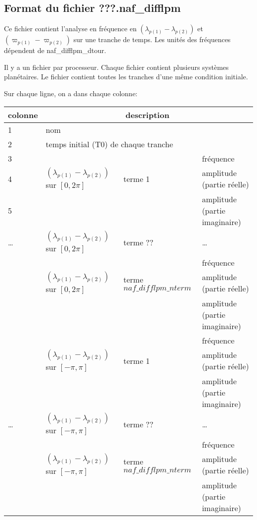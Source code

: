 \documentclass[11pt]{article}
\begin{document}
\subsection{Format du fichier {\bf ???.naf\_difflpm} }

Ce fichier contient l'analyse en fr\'equence en  $(\lambda_{p(1)}-\lambda_{p(2)})$ et $(\varpi_{p(1)}-\varpi_{p(2)})$ sur une tranche de temps. Les unit\'es des fr\'equences d\'ependent de naf\_difflpm\_dtour.

 Il y a un fichier par processeur. Chaque fichier contient plusieurs syst\`emes plan\'etaires. Le fichier contient toutes les tranches d'une m\^eme  condition initiale.


Sur chaque ligne, on a dans chaque colonne: 

\begin{tabularx}{\textwidth}{|l|l|l|X|}
 \hline
 colonne &      \multicolumn{3}{c|}{description} \\ \hline
1  &    \multicolumn{3}{l|}{nom} \\ \hline
2  &    \multicolumn{3}{l|}{temps initial (T0) de chaque tranche} \\ \hline
3 & &    & fr\'equence\\
4 &$(\lambda_{p(1)}-\lambda_{p(2)})$ sur $[0,2\pi]$& terme 1 & amplitude (partie r\'eelle)\\
5 &   & &amplitude (partie imaginaire)\\ \hline
\dots &  $(\lambda_{p(1)}-\lambda_{p(2)})$ sur $[0,2\pi]$& terme ?? &\dots \\ \hline
 & &    &fr\'equence\\
 &  $(\lambda_{p(1)}-\lambda_{p(2)})$ sur $[0,2\pi]$ & terme $naf\_difflpm\_nterm$ & amplitude (partie r\'eelle)\\
 & &    &amplitude (partie imaginaire)\\ \hline
 & &    & fr\'equence\\
 &$(\lambda_{p(1)}-\lambda_{p(2)})$ sur $[-\pi,\pi]$& terme 1 & amplitude (partie r\'eelle)\\
 &   & &amplitude (partie imaginaire)\\ \hline
\dots &  $(\lambda_{p(1)}-\lambda_{p(2)})$ sur $[-\pi,\pi]$& terme ?? &\dots \\ \hline
 & &    &fr\'equence\\
 &  $(\lambda_{p(1)}-\lambda_{p(2)})$ sur $[-\pi,\pi]$ & terme $naf\_difflpm\_nterm$ & amplitude (partie r\'eelle)\\
 & &    &amplitude (partie imaginaire)\\ \hline

\end{tabularx}
\end{document}
